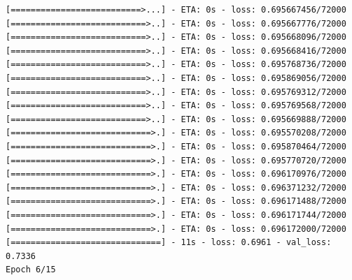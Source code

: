 \documentclass[12pt,fleqn]{article}\usepackage{../../common}
\begin{document}
\begin{verbatim}
[==========================>...] - ETA: 0s - loss: 0.695667456/72000 [===========================>..] - ETA: 0s - loss: 0.695667776/72000 [===========================>..] - ETA: 0s - loss: 0.695668096/72000 [===========================>..] - ETA: 0s - loss: 0.695668416/72000 [===========================>..] - ETA: 0s - loss: 0.695768736/72000 [===========================>..] - ETA: 0s - loss: 0.695869056/72000 [===========================>..] - ETA: 0s - loss: 0.695769312/72000 [===========================>..] - ETA: 0s - loss: 0.695769568/72000 [===========================>..] - ETA: 0s - loss: 0.695669888/72000 [============================>.] - ETA: 0s - loss: 0.695570208/72000 [============================>.] - ETA: 0s - loss: 0.695870464/72000 [============================>.] - ETA: 0s - loss: 0.695770720/72000 [============================>.] - ETA: 0s - loss: 0.696170976/72000 [============================>.] - ETA: 0s - loss: 0.696371232/72000 [============================>.] - ETA: 0s - loss: 0.696171488/72000 [============================>.] - ETA: 0s - loss: 0.696171744/72000 [============================>.] - ETA: 0s - loss: 0.696172000/72000 [==============================] - 11s - loss: 0.6961 - val_loss: 0.7336
Epoch 6/15

\end{verbatim}
\end{document}
